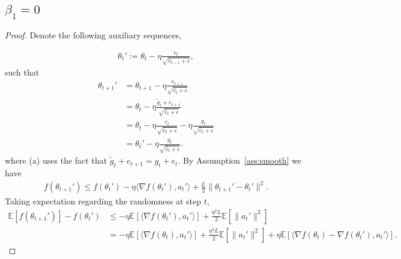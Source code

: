 \documentclass[11pt]{article}
\begin{document}
\subsection{$\beta_1=0$}
\begin{proof}

Denote the following auxiliary sequences,

\begin{align*}
\theta_{t}':=\theta_{t}-\eta\frac{e_t}{\sqrt{\hat v_{t-1}+\epsilon}},
\end{align*}
such that
\begin{align*}
    \theta_{t+1}'&=\theta_{t+1}-\eta\frac{e_{t+1}}{\sqrt{\hat v_t+\epsilon}}\\
    &=\theta_t-\eta\frac{\tilde g_t+e_{t+1}}{\sqrt{\hat v_t+\epsilon}}\\
    &=\theta_t-\eta\frac{e_{t}}{\sqrt{\hat v_t+\epsilon}}-\eta\frac{g_t}{\sqrt{\hat v_t+\epsilon}}\\
    &=\theta_t'-\eta\frac{g_t}{\sqrt{\hat v_t+\epsilon}}.
\end{align*}
where (a) uses the fact that $\tilde g_t+e_{t+1}=g_t+e_t$. By Assumption~\ref{ass:smooth} we have
\begin{align*}
    f(\theta_{t+1}')\leq f(\theta_t')-\eta\langle \nabla f(\theta_t'), a_t'\rangle+\frac{L}{2}\| \theta_{t+1}'-\theta_t'\|^2.
\end{align*}
{\color{red} Taking expectation regarding the randomness at step $t$,}
\begin{align}
    \mathbb E[f(\theta_{t+1}')]-f(\theta_t')&\leq -\eta\mathbb E[\langle \nabla f(\theta_t'), a_t'\rangle]+\frac{\eta^2L}{2}\mathbb E[\|a_t'\|^2] \nonumber\\
    &=-\eta\mathbb E[\langle \nabla f(\theta_t), a_t'\rangle]+\frac{\eta^2L}{2}\mathbb E[\|a_t'\|^2]+\eta\mathbb E[\langle \nabla f(\theta_t)-\nabla f(\theta_t'),a_t'\rangle]. \label{eq0betanull} 
\end{align}




\end{proof}
\end{document}
